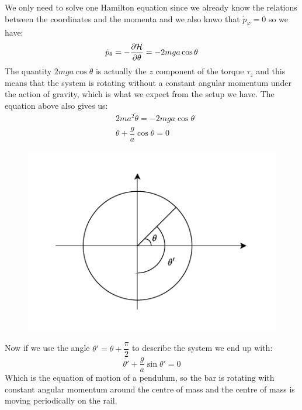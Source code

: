 We only need to solve one Hamilton equation since we already know the relations between the coordinates and the momenta and we also knwo that $\dot{p}_{\varphi} = 0$ so we have:
\begin{equation}
  \dot{p}_{\theta} = -\pdv{\hamfun}{\theta} = -2mga\cos\theta
\end{equation}
The quantity $2mga\cos\theta$ is actually the $z$ component of the torque $\tau_z$ and this means that the system is rotating without a constant angular momentum under the action of gravity, which is what we expect from the setup we have. The equation above also gives us:
\begin{equation}
  \begin{split}
    &2m a^2 \ddot{\theta} = -2mga\cos\theta \\[8pt]
    &\ddot{\theta} + \dfrac{g}{a}\cos\theta = 0
  \end{split}
\end{equation}
\begin{figure}[H]
  \centering
  \includegraphics[width=0.5\linewidth]{res/svg/theta_prime.drawio}
\end{figure}
Now if we use the angle $\theta' = \theta + \dfrac{\pi}{2}$ to describe the system we end up with:
\begin{equation}
  \ddot{\theta'} + \dfrac{g}{a}\sin\theta' = 0
\end{equation}
Which is the equation of motion of a pendulum, so the bar is rotating with constant angular momentum around the centre of mass and the centre of mass is moving periodically on the rail.
